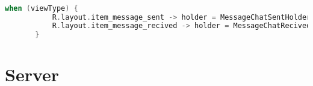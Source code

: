 \begin{lstlisting}[language=kotlin,caption={FragmentTodo.kt}]

when (viewType) {
           R.layout.item_message_sent -> holder = MessageChatSentHolder(itemView = view, dateOfLastMessage = lastItem?.timestamp)
           R.layout.item_message_recived -> holder = MessageChatRecivedHolder(itemView = view, dateOfLastMessage = lastItem?.timestamp)
       }
   \end{lstlisting}














\section{Server}                 %
